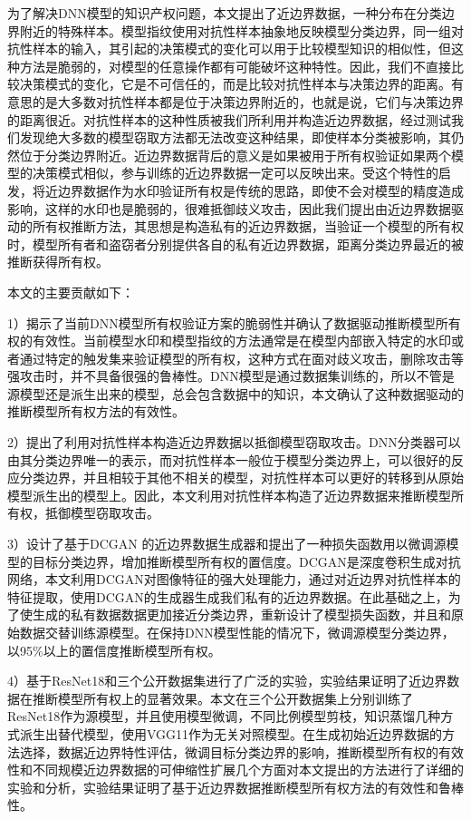 为了解决DNN模型的知识产权问题，本文提出了近边界数据，一种分布在分类边界附近的特殊样本。模型指纹\cite{cao2021ipguard}使用对抗性样本抽象地反映模型分类边界，同一组对抗性样本的输入，其引起的决策模式的变化可以用于比较模型知识的相似性，但这种方法是脆弱的，对模型的任意操作都有可能破坏这种特性。因此，我们不直接比较决策模式的变化，它是不可信任的，而是比较对抗性样本与决策边界的距离。有意思的是大多数对抗性样本都是位于决策边界附近的，也就是说，它们与决策边界的距离很近。对抗性样本的这种性质被我们所利用并构造近边界数据，经过测试我们发现绝大多数的模型窃取方法都无法改变这种结果，即使样本分类被影响，其仍然位于分类边界附近。近边界数据背后的意义是如果被用于所有权验证如果两个模型的决策模式相似，参与训练的近边界数据一定可以反映出来。受这个特性的启发，将近边界数据作为水印验证所有权是传统的思路，即使不会对模型的精度造成影响，这样的水印也是脆弱的，很难抵御歧义攻击，因此我们提出由近边界数据驱动的所有权推断方法，其思想是构造私有的近边界数据，当验证一个模型的所有权时，模型所有者和盗窃者分别提供各自的私有近边界数据，距离分类边界最近的被推断获得所有权。

本文的主要贡献如下：

1）揭示了当前DNN模型所有权验证方案的脆弱性并确认了数据驱动推断模型所有权的有效性。当前模型水印和模型指纹的方法通常是在模型内部嵌入特定的水印或者通过特定的触发集来验证模型的所有权，这种方式在面对歧义攻击，删除攻击等强攻击时，并不具备很强的鲁棒性。DNN模型是通过数据集训练的，所以不管是源模型还是派生出来的模型，总会包含数据中的知识，本文确认了这种数据驱动的推断模型所有权方法的有效性。

2）提出了利用对抗性样本构造近边界数据以抵御模型窃取攻击。DNN分类器可以由其分类边界唯一的表示，而对抗性样本一般位于模型分类边界上，可以很好的反应分类边界，并且相较于其他不相关的模型，对抗性样本可以更好的转移到从原始模型派生出的模型上。因此，本文利用对抗性样本构造了近边界数据来推断模型所有权，抵御模型窃取攻击。

3）设计了基于DCGAN 的近边界数据生成器和提出了一种损失函数用以微调源模型的目标分类边界，增加推断模型所有权的置信度。DCGAN是深度卷积生成对抗网络，本文利用DCGAN对图像特征的强大处理能力，通过对近边界对抗性样本的特征提取，使用DCGAN的生成器生成我们私有的近边界数据。在此基础之上，为了使生成的私有数据数据更加接近分类边界，重新设计了模型损失函数，并且和原始数据交替训练源模型。在保持DNN模型性能的情况下，微调源模型分类边界，以95\%以上的置信度推断模型所有权。

4）基于ResNet18\cite{he2016deep}和三个公开数据集进行了广泛的实验，实验结果证明了近边界数据在推断模型所有权上的显著效果。本文在三个公开数据集上分别训练了ResNet18作为源模型，并且使用模型微调，不同比例模型剪枝，知识蒸馏几种方式派生出替代模型，使用VGG11\cite{simonyan2014very}作为无关对照模型。在生成初始近边界数据的方法选择，数据近边界特性评估，微调目标分类边界的影响，推断模型所有权的有效性和不同规模近边界数据的可伸缩性扩展几个方面对本文提出的方法进行了详细的实验和分析，实验结果证明了基于近边界数据推断模型所有权方法的有效性和鲁棒性。

